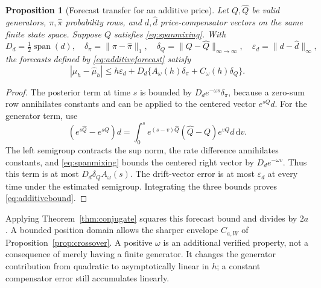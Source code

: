 \documentclass[11pt]{article}
\theoremstyle{plain}
\newtheorem{proposition}[theorem]{Proposition}
\theoremstyle{definition}
\theoremstyle{remark}
\newcommand{\dd}{\,\mathrm d}
\newcommand{\norm}[1]{\lVert#1\rVert}
\DeclareMathOperator{\spn}{span}
\begin{document}
\begin{proposition}[Forecast transfer for an additive price]
\label{prop:additivetransfer}
Let \(Q,\widehat Q\) be valid generators, \(\pi,\widehat\pi\)
probability rows, and \(d,\widehat d\) price-compensator vectors on the
same finite state space. Suppose \(Q\) satisfies
\eqref{eq:spanmixing}. With
\[
 D_d=\tfrac12\spn(d),\quad
 \delta_\pi=\norm{\pi-\widehat\pi}_1,\quad
 \delta_Q=\norm{Q-\widehat Q}_{\infty\to\infty},\quad
 \varepsilon_d=\norm{d-\widehat d}_\infty,
\]
the forecasts defined by \eqref{eq:additiveforecast} satisfy
\begin{equation}\label{eq:additivebound}
 |\mu_h-\widehat\mu_h|
 \le h\varepsilon_d+
 D_d\{A_\omega(h)\delta_\pi+C_\omega(h)\delta_Q\}.
\end{equation}
\end{proposition}
\begin{proof}
The posterior term at time \(s\) is bounded by
\(D_d e^{-\omega s}\delta_\pi\), because a zero-sum row annihilates
constants and can be applied to the centered vector \(e^{sQ}d\).
For the generator term, use
\[
 (e^{s\widehat Q}-e^{sQ})d
 =\int_0^s e^{(s-v)\widehat Q}
            (\widehat Q-Q)e^{vQ}d\dd v.
\]
The left semigroup contracts the sup norm, the rate difference
annihilates constants, and \eqref{eq:spanmixing} bounds the centered
right vector by \(D_d e^{-\omega v}\). Thus this term is at most
\(D_d\delta_Q A_\omega(s)\). The drift-vector error is at most
\(\varepsilon_d\) at every time under the estimated semigroup.
Integrating the three bounds proves \eqref{eq:additivebound}.
\end{proof}

Applying Theorem~\ref{thm:conjugate} squares this forecast bound and
divides by \(2a\). A bounded position domain allows the sharper
envelope \(C_{a,W}\) of Proposition~\ref{prop:crossover}.
A positive \(\omega\) is an additional verified property, not a
consequence of merely having a finite generator. It changes the
generator contribution from quadratic to asymptotically linear in
\(h\); a constant compensator error still accumulates linearly.
\end{document}

